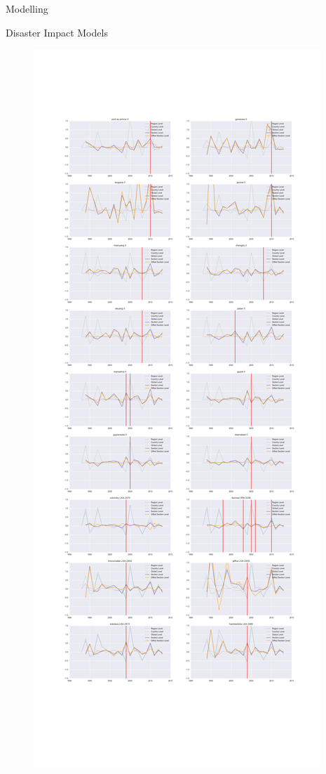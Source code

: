\documentclass[12pt,fleqn,leqno,letterpaper]{article}
\begin{document}
\begin{section}{Modelling}
\begin{subsection}{Disaster Impact Models}
\begin{figure}[t!]
      \includegraphics[width=1\linewidth]{pca_balancer_diffs}\label{fig:weighted_balanced_luminosity_sum_series} %

\end{figure}
\end{subsection}
\end{section}
\end{document}
